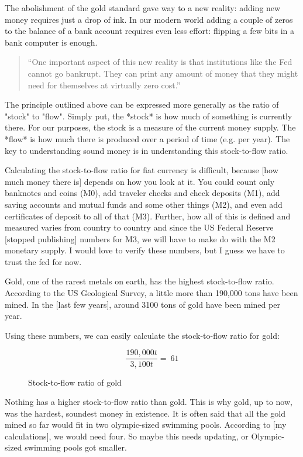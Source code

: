 The abolishment of the gold standard gave way to a new reality: adding
new money requires just a drop of ink. In our modern world adding a
couple of zeros to the balance of a bank account requires even less
effort: flipping a few bits in a bank computer is enough.

\begin{quotation}
``One important aspect of this new reality is that institutions like
the Fed cannot go bankrupt. They can print any amount of money that
they might need for themselves at virtually zero cost.''
\end{quotation}

The principle outlined above can be expressed more generally as the
ratio of "stock" to "flow". Simply put, the *stock* is how much of
something is currently there. For our purposes, the stock is a measure
of the current money supply. The *flow* is how much there is produced
over a period of time (e.g. per year). The key to understanding sound
money is in understanding this stock-to-flow ratio.

Calculating the stock-to-flow ratio for fiat currency is difficult,
because [how much money there is] depends on how you look at it. You
could count only banknotes and coins (M0), add traveler checks and check
deposits (M1), add saving accounts and mutual funds and some other
things (M2), and even add certificates of deposit to all of that (M3).
Further, how all of this is defined and measured varies from country to
country and since the US Federal Reserve [stopped publishing] numbers
for M3, we will have to make do with the M2 monetary supply. I would
love to verify these numbers, but I guess we have to trust the fed for
now.

Gold, one of the rarest metals on earth, has the highest stock-to-flow
ratio. According to the US Geological Survey, a little more than 190,000
tons have been mined. In the [last few years], around 3100 tons of gold
have been mined per year.

Using these numbers, we can easily calculate the stock-to-flow ratio for
gold:

\begin{figure}
  \centering
  \begin{equation}
  \frac{190,000 t}{3,100 t} = ~ 61
  \end{equation}
  \caption{Stock-to-flow ratio of gold}
  \label{fig:stock-to-flow-gold}
\end{figure}

Nothing has a higher stock-to-flow ratio than gold. This is why gold, up
to now, was the hardest, soundest money in existence. It is often said
that all the gold mined so far would fit in two olympic-sized swimming
pools. According to [my calculations], we would need four. So maybe this
needs updating, or Olympic-sized swimming pools got smaller.

